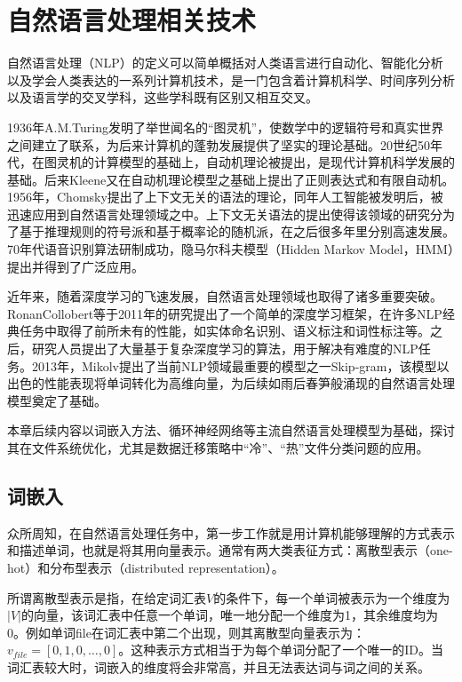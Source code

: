 \section{自然语言处理相关技术}
自然语言处理（NLP）的定义可以简单概括对人类语言进行自动化、智能化分析以及学会人类表达的一系列计算机技术，是一门包含着计算机科学、时间序列分析以及语言学的交叉学科，这些学科既有区别又相互交叉。

1936年A.M.Turing发明了举世闻名的“图灵机”，使数学中的逻辑符号和真实世界之间建立了联系，为后来计算机的蓬勃发展提供了坚实的理论基础。20世纪50年代，在图灵机的计算模型的基础上，自动机理论被提出，是现代计算机科学发展的基础\cite{自然语言处理的历史与现状}。后来Kleene又在自动机理论模型之基础上提出了正则表达式和有限自动机。1956年，Chomsky提出了上下文无关的语法的理论，同年人工智能被发明后，被迅速应用到自然语言处理领域之中。上下文无关语法的提出使得该领域的研究分为了基于推理规则的符号派和基于概率论的随机派\cite{宋一凡2019自然语言处理的发展历史与现状}，在之后很多年里分别高速发展。70年代语音识别算法研制成功，隐马尔科夫模型（Hidden Markov Model，HMM）提出并得到了广泛应用\cite{自然语言处理的历史与现状}。

近年来，随着深度学习的飞速发展，自然语言处理领域也取得了诸多重要突破。RonanCollobert等\cite{Natural_language_processing_(almost)_from_scratch}于2011年的研究提出了一个简单的深度学习框架，在许多NLP经典任务中取得了前所未有的性能，如实体命名识别、语义标注和词性标注等。之后，研究人员提出了大量基于复杂深度学习的算法，用于解决有难度的NLP任务。2013年，Mikolv\cite{skipgram}提出了当前NLP领域最重要的模型之一Skip-gram，该模型以出色的性能表现将单词转化为高维向量，为后续如雨后春笋般涌现的自然语言处理模型奠定了基础。

本章后续内容以词嵌入方法、循环神经网络等主流自然语言处理模型为基础，探讨其在文件系统优化，尤其是数据迁移策略中“冷”、“热”文件分类问题的应用。

\subsection{词嵌入}


众所周知，在自然语言处理任务中，第一步工作就是用计算机能够理解的方式表示和描述单词，也就是将其用向量表示。通常有两大类表征方式：离散型表示（one-hot）和分布型表示（distributed representation）。

所谓离散型表示是指，在给定词汇表$V$的条件下，每一个单词被表示为一个维度为$|V|$的向量，该词汇表中任意一个单词，唯一地分配一个维度为1，其余维度均为0。例如单词file在词汇表中第二个出现，则其离散型向量表示为：$v_{file} = [0,1,0,\dots,0]$。这种表示方式相当于为每个单词分配了一个唯一的ID。当词汇表较大时，词嵌入的维度将会非常高，并且无法表达词与词之间的关系。

